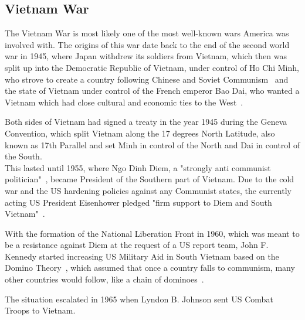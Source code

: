 \subsection{Vietnam War}
The Vietnam War is most likely one of the most well-known wars America was involved with.
The origins of this war date back to the end of the second world war in 1945, where Japan withdrew its soldiers from Vietnam, which then was split up into the Democratic Republic of Vietnam, under control of Ho Chi Minh, who strove to create a country following Chinese and Soviet Communism~\autocite{vietnam-war-history} and the state of Vietnam under control of the French emperor Bao Dai, who wanted a Vietnam which had close cultural and economic ties to the West~\autocite{vietnam-war-history}.

Both sides of Vietnam had signed a treaty in the year 1945 during the Geneva Convention, which split Vietnam along the 17 degrees North Latitude, also known as 17th Parallel and set Minh in control of the North and Dai in control of the South.\\
This lasted until 1955, where Ngo Dinh Diem, a "strongly anti communist politician"~\autocite{vietnam-war-history}, became President of the Southern part of Vietnam. Due to the cold war and the US hardening policies against any Communist states, the currently acting US President Eisenhower pledged "firm support to Diem and South Vietnam"~\autocite{vietnam-war-history}.

With the formation of the National Liberation Front in 1960, which was meant to be a resistance against Diem at the request of a US report team, John F. Kennedy started increasing US Military Aid in South Vietnam based on the Domino Theory~\autocite{vietnam-war-history}, which assumed that once a country falls to communism, many other countries would follow, like a chain of dominoes~\autocite{cold-war-domino-theory}.

The situation escalated in 1965 when Lyndon B. Johnson sent US Combat Troops to Vietnam.